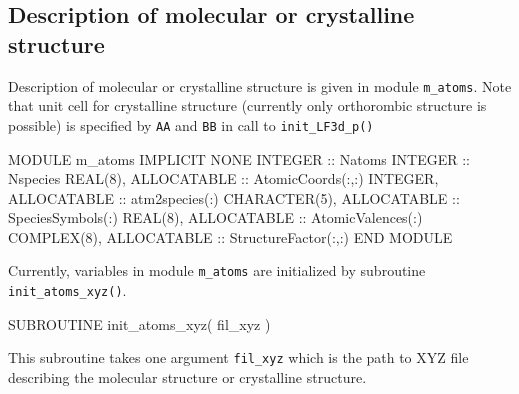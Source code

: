 \subsection{Description of molecular or crystalline structure}

Description of molecular or crystalline structure is given in module {\tt m\_atoms}.
Note that unit cell for crystalline structure (currently only orthorombic structure is
possible) is specified by {\tt AA} and {\tt BB} in call to {\tt init\_LF3d\_p()}

\begin{fortrancode}
MODULE m_atoms
  IMPLICIT NONE 
  INTEGER :: Natoms
  INTEGER :: Nspecies
  REAL(8), ALLOCATABLE :: AtomicCoords(:,:)
  INTEGER, ALLOCATABLE :: atm2species(:)
  CHARACTER(5), ALLOCATABLE :: SpeciesSymbols(:)
  REAL(8), ALLOCATABLE :: AtomicValences(:)
  COMPLEX(8), ALLOCATABLE :: StructureFactor(:,:)
END MODULE 
\end{fortrancode}

Currently, variables in module {\tt m\_atoms} are initialized by
subroutine {\tt init\_atoms\_xyz()}.
\begin{fortrancode}
SUBROUTINE init_atoms_xyz( fil_xyz )
\end{fortrancode}
This subroutine takes one argument {\tt fil\_xyz} which is the path
to XYZ file describing the molecular structure or crystalline structure.


